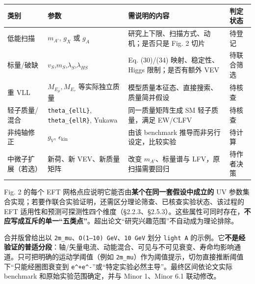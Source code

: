 \documentclass[
  chinese,
  UTF8]{ctexart}
\newcounter{none} %
\begin{document}
{\def\LTcaptype{none} %
\begin{longtable}[]{@{}
  >{\raggedright\arraybackslash}p{}
  >{\raggedright\arraybackslash}p{}
  >{\raggedright\arraybackslash}p{}
  >{\raggedright\arraybackslash}p{}@{}}
\toprule\noalign{}
\begin{minipage}[b]{\linewidth}\raggedright
类别
\end{minipage} & \begin{minipage}[b]{\linewidth}\raggedright
参数
\end{minipage} & \begin{minipage}[b]{\linewidth}\raggedright
需说明的内容
\end{minipage} & \begin{minipage}[b]{\linewidth}\raggedright
判定状态
\end{minipage} \\
\midrule\noalign{}
\endhead
\bottomrule\noalign{}
\endlastfoot
低能扫描 & \(m_{A'}\), \(g_X\) 或 \(g_A\) &
研究上下限、扫描方式、动机；是否只是 Fig. 2 切片 & 待登记 \\
标量/破缺 & \(v_S\),\(m_S\),\(\lambda_S\),\(\lambda_{HS}\) & Eq.
(30)/(34) 映射、稳定性、Higgs 限制；是否有额外 VEV & 待联合筛选 \\
重 VLL & \(M_{E_\mu},M_{E_\tau}\) 等实际独立质量 &
模型质量本征态、直接搜索、质量简并假设 & 待核查 \\
轻子质量/混合 & \texttt{theta\_\{ellL\}}, \texttt{theta\_\{ellR\}},
Yukawa & 同一质量矩阵生成 SM 轻子质量，满足 EW/CLFV & 待核查 \\
非纯轴修正 & \(g_V\), \(\epsilon_{\mathrm{kin}}\) & 由该 benchmark
推导而非另行设定，比较实验 & 待计算 \\
中微子扩展（若选） & 新荷、新 VEV、新质量矩阵 & 改变
\(m_{A'}\)、标量谱与 LFV，原扫描需要回归 & 待作者决策 \\
\end{longtable}
}

Fig. 2 的每个 EFT 网格点应说明它能否由\textbf{某个在同一套假设中成立的}
UV
参数集合实现；若要作联合实验证明，还需区分理论筛查、已核查实验状态、该过程的
EFT
适用性和预测可探测性四个维度（§2.2.3、§2.5.3）。这些属性可同时存在，\textbf{不应写成互斥的单一``五类点''}。超出论文``研究兴趣范围''不自动成为理论排除。

合并版曾给出以 \texttt{2m\_mu}、\texttt{O(1–10)\ GeV}、\texttt{10\ GeV}
划分 \texttt{light\ A\textquotesingle{}}
的示例。它\textbf{不是经验证的普适分段}：轴/矢量电流、动能混合、可见与不可见衰变、寿命均影响通道。只可把明确的运动学阈值（例如
\texttt{2m\_mu}）作为阈值提示，切勿直接推断阈值下``只能经圈图衰变到
\texttt{e\^{}+e\^{}-}''或``特定实验必然主导''。最终区间依论文实际
benchmark 和原始实验范围确定，并与 Minor 1、Minor 6.1 联动修改。
\end{document}
